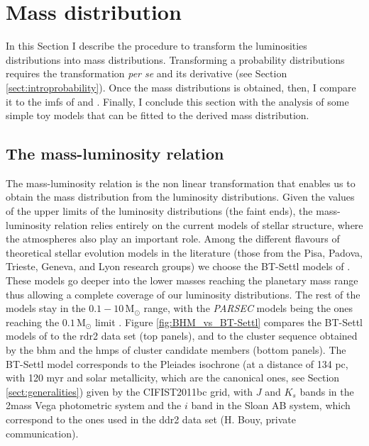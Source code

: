 \section{Mass distribution}
\label{sect:massdistributionresults}

In this Section I describe the procedure to transform the luminosities distributions into mass distributions. Transforming a  probability distributions requires the transformation \emph{per se} and its derivative (see Section \ref{sect:introprobability}). Once the mass distributions is obtained,  then, I compare it to the \glspl{imf} of \citet{Chabrier2005} and \citet{Thies2007}. Finally, I conclude this section with the analysis of some simple toy models that can be fitted to the derived mass distribution.

\subsection{The mass-luminosity relation}
\label{sect:mass-luminosity}
The mass-luminosity relation is the non linear transformation that enables us to obtain the mass distribution from the luminosity distributions. Given the values of the upper limits of the luminosity distributions (the faint ends), the mass-luminosity relation relies entirely on the current models of stellar structure, where the atmospheres also play an important role. Among the different flavours of theoretical stellar evolution models in the literature (those from the Pisa, Padova, Trieste, Geneva, and Lyon research groups) we choose the BT-Settl models of \citet{Allard2012}. These models go deeper into the lower masses reaching the planetary mass range thus allowing a complete coverage of our luminosity distributions. The rest of the models stay in the $0.1-10\,\mathrm{M_{\odot}}$ range, with the \emph{PARSEC} models being the ones reaching the $0.1\,\mathrm{M_{\odot}}$ limit \citep{Bressan2012}.  Figure \ref{fig:BHM_vs_BT-Settl} compares the BT-Settl models of \citet{Allard2012} to the \gls{rdr2} data set (top panels), and to the cluster sequence obtained by the \gls{bhm} and the \gls{hmps} of cluster candidate members (bottom panels). The BT-Settl model corresponds to the Pleiades isochrone (at a distance of 134 pc, with 120 \gls{myr} and solar metallicity, which are the canonical ones, see Section \ref{sect:generalities}) given by the CIFIST2011bc grid, with $J$ and $K_s$ bands in the \gls{2mass} Vega photometric system and the $i$ band in the Sloan AB system, which correspond to the ones used in the \gls{ddr2} data set (H. Bouy, private communication).

